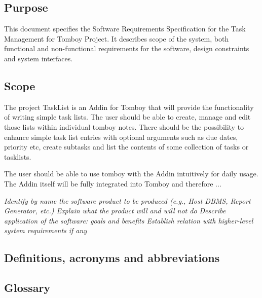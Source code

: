 \subsection{Purpose}
\label{intro:purpose}
This document specifies the Software Requirements Specification for the Task Management for Tomboy Project. 
It describes scope of the system, both functional and non-functional requirements for the software, design constraints and system interfaces.


\subsection{Scope}
\label{intro:scope}
The project TaskList is an Addin for Tomboy that will provide the functionality of writing simple task lists. The user should be able to create, manage and edit those lists within individual tomboy notes. 
There should be the possibility to enhance simple task list entries with optional arguments such as due dates, priority etc, create subtasks and list the contents of some collection of tasks or tasklists.  

The user should be able to use tomboy with the Addin intuitively for daily usage. The Addin itself will be fully integrated into Tomboy and therefore ...

\textit{Identify by name the software product to be produced (e.g., Host DBMS, Report Generator, etc.)
Explain what the product will and will not do
Describe application of the software: goals and benefits
Establish relation with higher-level system requirements if any}

\subsection{Definitions, acronyms and abbreviations}
\label{intro:definitions}

\begin{objects}
\end{objects}


\subsection{Glossary}
\label{intro:glossary}

